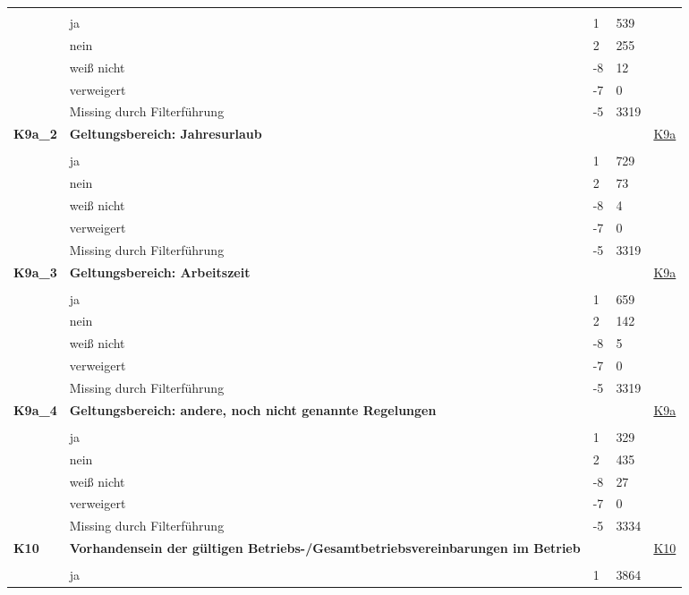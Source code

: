 \begin{longtable}{| L{2.5cm} | L{8.25cm}| C{1.5cm} | R{1.25cm} | C{2.25cm} |  }
   &  &  &  &  \\ 
   & ja & 1 & 539 &  \\ 
   & nein & 2 & 255 &  \\ 
   & weiß nicht & -8 & 12 &  \\ 
   & verweigert & -7 & 0 &  \\ 
   & Missing durch Filterführung & -5 & 3319 &  \\ 
   \midrule
\textbf{K9a\_2}\label{var:suf:K9a:2} & \textbf{Geltungsbereich: Jahresurlaub} &  &  & \hyperref[K9a]{K9a} \\ 
   &  &  &  &  \\ 
   & ja & 1 & 729 &  \\ 
   & nein & 2 & 73 &  \\ 
   & weiß nicht & -8 & 4 &  \\ 
   & verweigert & -7 & 0 &  \\ 
   & Missing durch Filterführung & -5 & 3319 &  \\ 
   \midrule
\textbf{K9a\_3}\label{var:suf:K9a:3} & \textbf{Geltungsbereich: Arbeitszeit} &  &  & \hyperref[K9a]{K9a} \\ 
   &  &  &  &  \\ 
   & ja & 1 & 659 &  \\ 
   & nein & 2 & 142 &  \\ 
   & weiß nicht & -8 & 5 &  \\ 
   & verweigert & -7 & 0 &  \\ 
   & Missing durch Filterführung & -5 & 3319 &  \\ 
   \midrule
\textbf{K9a\_4}\label{var:suf:K9a:4} & \textbf{Geltungsbereich: andere, noch nicht genannte Regelungen} &  &  & \hyperref[K9a]{K9a} \\ 
   &  &  &  &  \\ 
   & ja & 1 & 329 &  \\ 
   & nein & 2 & 435 &  \\ 
   & weiß nicht & -8 & 27 &  \\ 
   & verweigert & -7 & 0 &  \\ 
   & Missing durch Filterführung & -5 & 3334 &  \\ 
   \midrule
\textbf{K10}\label{var:suf:K10} & \textbf{Vorhandensein der gültigen Betriebs-/Gesamtbetriebsvereinbarungen im Betrieb} &  &  & \hyperref[K10]{K10} \\ 
   &  &  &  &  \\ 
   & ja & 1 & 3864 &  \\ 

\end{longtable}
